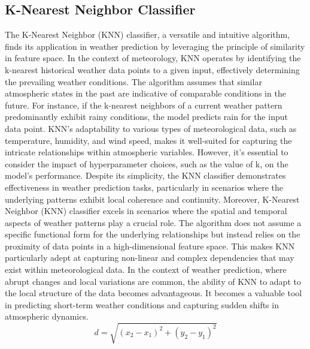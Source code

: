 \documentclass[conference]{IEEEtran}
\begin{document}
\subsection{\textbf{K-Nearest Neighbor Classifier}}
The K-Nearest Neighbor (KNN) classifier, a versatile and intuitive algorithm, finds its application in weather prediction by leveraging the principle of similarity in feature space. In the context of meteorology, KNN operates by identifying the k-nearest historical weather data points to a given input, effectively determining the prevailing weather conditions. The algorithm assumes that similar atmospheric states in the past are indicative of comparable conditions in the future. For instance, if the k-nearest neighbors of a current weather pattern predominantly exhibit rainy conditions, the model predicts rain for the input data point. KNN's adaptability to various types of meteorological data, such as temperature, humidity, and wind speed, makes it well-suited for capturing the intricate relationships within atmospheric variables. However, it's essential to consider the impact of hyperparameter choices, such as the value of k, on the model's performance. Despite its simplicity, the KNN classifier demonstrates effectiveness in weather prediction tasks, particularly in scenarios where the underlying patterns exhibit local coherence and continuity. Moreover, K-Nearest Neighbor (KNN) classifier excels in scenarios where the spatial and temporal aspects of weather patterns play a crucial role. The algorithm does not assume a specific functional form for the underlying relationships but instead relies on the proximity of data points in a high-dimensional feature space. This makes KNN particularly adept at capturing non-linear and complex dependencies that may exist within meteorological data. In the context of weather prediction, where abrupt changes and local variations are common, the ability of KNN to adapt to the local structure of the data becomes advantageous. It becomes a valuable tool in predicting short-term weather conditions and capturing sudden shifts in atmospheric dynamics.
\indent\indent \[ d = \sqrt{(x_2 - x_1)^2 + (y_2 - y_1)^2} \]
\end{document}
